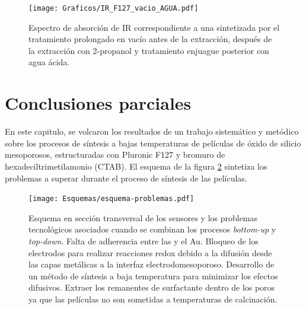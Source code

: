 {			\begin{figure}[!ht]
			\begin{center}
			\texttt{[image: Graficos/IR\_F127\_vacio\_AGUA.pdf]}
			\caption[FTIR extracción agua ácida.]{Espectro de absorción de IR correspondiente a una \pdmF\space sintetizada por el tratamiento prolongado en vacío antes de la extracción, después de la extracción con 2-propanol y tratamiento enjuague posterior con agua ácida.}
			\label{fig:IR_agua}
			\end{center}
			\end{figure}

\section{Conclusiones parciales}

	En este capitulo, se volcaron los resultados de un trabajo sistemático y metódico sobre los procesos de síntesis a bajas temperaturas de películas de óxido de silicio mesoporosos, estructuradas con Pluronic F127 y bromuro de hexadeciltrimetilamonio (CTAB). El esquema de la figura \ref{fig:modelo-problemas} sintetiza los problemas a superar durante el proceso de síntesis de las películas.

			\begin{figure}[!ht]
			\begin{center}
			\texttt{[image: Esquemas/esquema-problemas.pdf]}
			\caption[Modelo de los problemas tecnologicos]{Esquema en sección transversal de los sensores y los problemas tecnológicos asociados cuando se combinan los procesos\textit{ bottom-up} y\textit{ top-down}. \unorojo Falta de adherencia entre las \pdm\space y el Au. \dosvioleta Bloqueo de los electrodos para realizar reacciones redox debido a la difusión desde las capas metálicas a la interfaz electrodo\textbar mesoporoso. \tresamarillo Desarrollo de un método de síntesis a baja temperatura para minimizar los efectos difusivos. \cuatronaranja Extraer los remanentes de surfactante dentro de los poros ya que las películas no son sometidas a temperaturas de calcinación.}
			\label{fig:modelo-problemas}
			\end{center}
			\end{figure}
	

}
